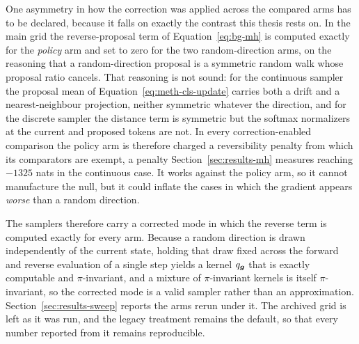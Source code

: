 One asymmetry in how the correction was applied across the compared arms has to be declared, because it falls on exactly the contrast this thesis rests on. In the main grid the reverse-proposal term of Equation~\eqref{eq:bg-mh} is computed exactly for the \emph{policy} arm and set to zero for the two random-direction arms, on the reasoning that a random-direction proposal is a symmetric random walk whose proposal ratio cancels. That reasoning is not sound: for the continuous sampler the proposal mean of Equation~\eqref{eq:meth-cls-update} carries both a drift and a nearest-neighbour projection, neither symmetric whatever the direction, and for the discrete sampler the distance term is symmetric but the softmax normalizers at the current and proposed tokens are not. In every correction-enabled comparison the policy arm is therefore charged a reversibility penalty from which its comparators are exempt, a penalty Section~\ref{sec:results-mh} measures reaching $-1325$ nats in the continuous case. It works against the policy arm, so it cannot manufacture the null, but it could inflate the cases in which the gradient appears \emph{worse} than a random direction.

The samplers therefore carry a corrected mode in which the reverse term is computed exactly for every arm. Because a random direction is drawn independently of the current state, holding that draw fixed across the forward and reverse evaluation of a single step yields a kernel $q_{\bm{g}}$ that is exactly computable and $\pi$-invariant, and a mixture of $\pi$-invariant kernels is itself $\pi$-invariant, so the corrected mode is a valid sampler rather than an approximation. Section~\ref{sec:results-sweep} reports the arms rerun under it. The archived grid is left as it was run, and the legacy treatment remains the default, so that every number reported from it remains reproducible.

